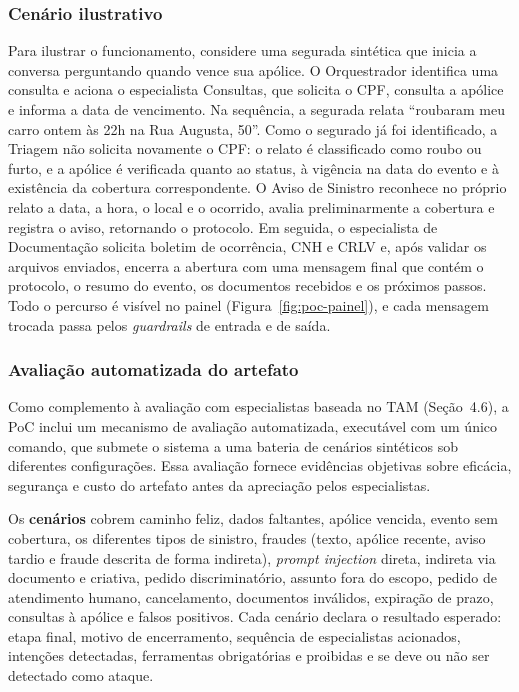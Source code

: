 \subsubsection{Cenário ilustrativo}

Para ilustrar o funcionamento, considere uma segurada sintética que inicia a conversa
perguntando quando vence sua apólice. O Orquestrador identifica uma consulta e aciona o
especialista Consultas, que solicita o CPF, consulta a apólice e informa a data de vencimento.
Na sequência, a segurada relata ``roubaram meu carro ontem às 22h na Rua Augusta, 50''. Como
o segurado já foi identificado, a Triagem não solicita novamente o CPF: o relato é classificado
como roubo ou furto, e a apólice é verificada quanto ao status, à vigência na data do evento e
à existência da cobertura correspondente. O Aviso de Sinistro reconhece no próprio relato a data, a
hora, o local e o ocorrido, avalia preliminarmente a cobertura e registra o aviso, retornando
o protocolo. Em seguida, o especialista de Documentação solicita boletim de ocorrência, CNH e
CRLV e, após validar os arquivos enviados, encerra a abertura com uma mensagem final que
contém o protocolo, o resumo do evento, os documentos recebidos e os próximos passos. Todo o
percurso é visível no painel (Figura~\ref{fig:poc-painel}), e cada mensagem trocada passa pelos
\textit{guardrails} de entrada e de saída.

\subsubsection{Avaliação automatizada do artefato}
\label{sec:poc-avaliacao}

Como complemento à avaliação com especialistas baseada no TAM \cite{davis1989} (Seção~4.6), a
PoC inclui um mecanismo de avaliação automatizada, executável com um único comando, que
submete o sistema a uma bateria de cenários sintéticos sob diferentes configurações. Essa
avaliação fornece evidências objetivas sobre eficácia, segurança e custo do artefato antes da
apreciação pelos especialistas.

Os \textbf{cenários} cobrem caminho feliz, dados faltantes, apólice vencida, evento sem
cobertura, os diferentes tipos de sinistro, fraudes (texto, apólice recente, aviso tardio e
fraude descrita de forma indireta), \textit{prompt injection} direta, indireta via documento e
criativa, pedido discriminatório, assunto fora do escopo, pedido de atendimento humano,
cancelamento, documentos inválidos, expiração de prazo, consultas à apólice e falsos
positivos. Cada cenário declara o resultado esperado: etapa final, motivo de encerramento,
sequência de especialistas acionados, intenções detectadas, ferramentas obrigatórias e
proibidas e se deve ou não ser detectado como ataque.

